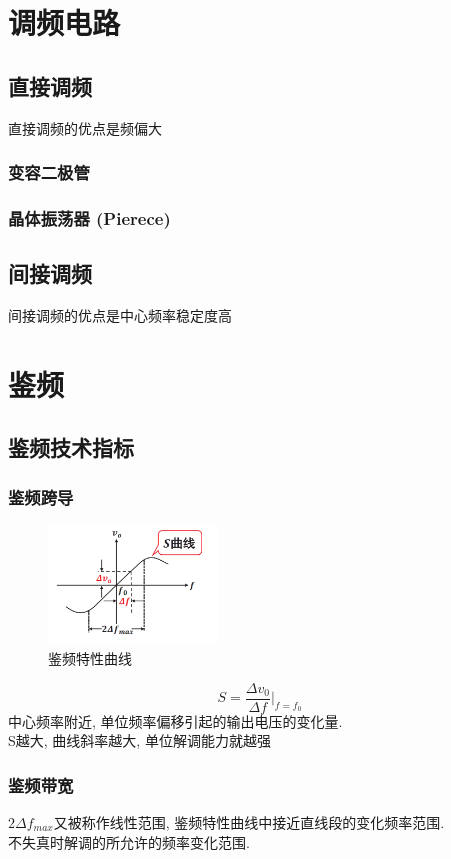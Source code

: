\documentclass[a4paper]{report}
\begin{document}
\section{调频电路}
\subsection{直接调频}
直接调频的优点是频偏大
\subsubsection{变容二极管}
\subsubsection{晶体振荡器 (Pierece)}
\subsection{间接调频}
间接调频的优点是中心频率稳定度高
\section{鉴频}
\subsection{鉴频技术指标}
\subsubsection{鉴频跨导}
\begin{figure}[H]
\centering
\includegraphics[width=0.4\textwidth]{fm_dis_trans_con.png}
\caption{鉴频特性曲线}
\end{figure}
$$S=\frac{\Delta v_0}{\Delta f}|_{f=f_0}$$
中心频率附近, 单位频率偏移引起的输出电压的变化量. \\
S越大, 曲线斜率越大, 单位解调能力就越强
\subsubsection{鉴频带宽}
$2\Delta f_{max}$又被称作线性范围, 鉴频特性曲线中接近直线段的变化频率范围. \\
不失真时解调的所允许的频率变化范围. 
\end{document}
